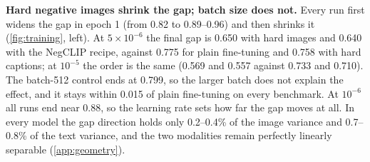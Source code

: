 \documentclass{article}
\begin{document}
\textbf{Hard negative images shrink the gap; batch size does not.}
Every run first widens the gap in epoch 1 (from 0.82 to 0.89--0.96) and then shrinks it (\cref{fig:training}, left). At $5{\times}10^{-6}$ the final gap is 0.650 with hard images and 0.640 with the NegCLIP recipe, against 0.775 for plain fine-tuning and 0.758 with hard captions; at $10^{-5}$ the order is the same (0.569 and 0.557 against 0.733 and 0.710). The batch-512 control ends at 0.799, so the larger batch does not explain the effect, and it stays within 0.015 of plain fine-tuning on every benchmark. At $10^{-6}$ all runs end near 0.88, so the learning rate sets how far the gap moves at all. In every model the gap direction holds only 0.2--0.4\% of the image variance and 0.7--0.8\% of the text variance, and the two modalities remain perfectly linearly separable (\cref{app:geometry}).
\end{document}
